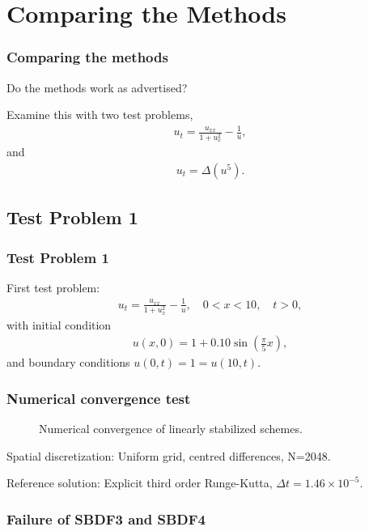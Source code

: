 \documentclass[hyperref={pdfpagelabels=false}]{beamer}
\begin{document}
\section{Comparing the Methods} 
\begin{frame}
	\frametitle{Comparing the methods}
Do the methods work as advertised? 	

Examine this with two test problems,
\begin{align*}
u_t = \frac{u_{xx}}{1 + u_x^2} - \frac{1}{u}, 
\end{align*}
and 
\begin{align*}
u_t = \Delta(u^5).
\end{align*}
\end{frame}

\subsection{Test Problem 1} 
\begin{frame}
	\frametitle{Test Problem 1} 
First test problem: 
\begin{align*}
	u_t = \frac{u_{xx}}{1 + u_x^2} - \frac{1}{u}, 
	\quad 0 < x < 10,\quad t > 0, 
\end{align*}
with initial condition 
\begin{align*}
	u(x,0) = 1 + 0.10\sin\left(\frac{\pi}{5}x \right),
\end{align*}
and boundary conditions $u(0,t) = 1 = u(10,t)$.
\end{frame}
\begin{frame}
	\frametitle{Numerical convergence test}
	\begin{figure}[t]
		\centering
		\caption{Numerical convergence of linearly stabilized schemes.}
	\end{figure}
	Spatial discretization: Uniform grid, centred differences, N=2048.
	
	Reference solution: Explicit third order Runge-Kutta, $\Delta t = 1.46\times 10^{-5}$.	
\end{frame}
\begin{frame}
	\frametitle{Failure of SBDF3 and SBDF4}

\end{frame}
\end{document}
